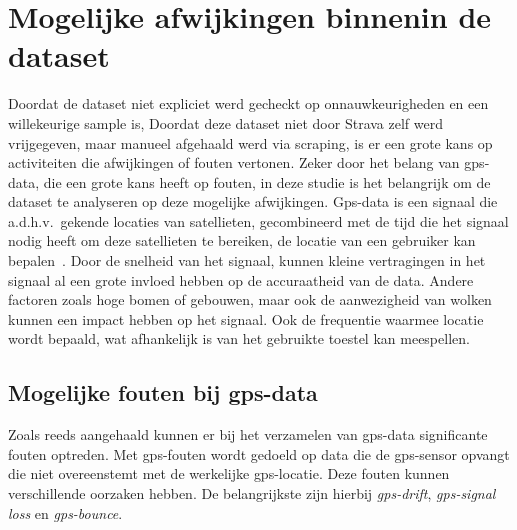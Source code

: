 \section{Mogelijke afwijkingen binnenin de dataset}
Doordat de dataset niet expliciet werd gecheckt op onnauwkeurigheden en een
willekeurige sample is, Doordat deze dataset niet door Strava zelf werd
vrijgegeven, maar manueel afgehaald werd via scraping, is er een grote kans op
activiteiten die afwijkingen of fouten vertonen. Zeker door het belang van
\ac{gps}-data, die een grote kans heeft op fouten, in deze studie is het
belangrijk om de dataset te analyseren op deze mogelijke afwijkingen. Gps-data
is een signaal die a.d.h.v.\ gekende locaties van satellieten, gecombineerd met
de tijd die het signaal nodig heeft om deze satellieten te bereiken, de locatie
van een gebruiker kan bepalen~\cite{BadGPSDa19:online}. Door de snelheid van
het signaal, kunnen kleine vertragingen in het signaal al een grote invloed
hebben op de accuraatheid van de data. Andere factoren zoals hoge bomen of
gebouwen, maar ook de aanwezigheid van wolken kunnen een impact hebben op het
signaal. Ook de frequentie waarmee locatie wordt bepaald, wat afhankelijk is
van het gebruikte toestel kan meespellen.

\subsection{Mogelijke fouten bij gps-data}
Zoals reeds aangehaald kunnen er bij het verzamelen van \ac{gps}-data
significante fouten optreden. Met \ac{gps}-fouten wordt gedoeld op data die de
\ac{gps}-sensor opvangt die niet overeenstemt met de werkelijke
\ac{gps}-locatie. Deze fouten kunnen verschillende oorzaken hebben. De
belangrijkste zijn hierbij \textit{\ac{gps}-drift}, \textit{\ac{gps}-signal
    loss} en \textit{\ac{gps}-bounce}.

